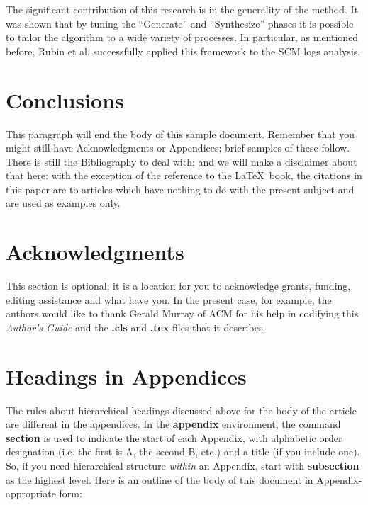 \documentclass{sig-alternate}
\begin{document}
The significant contribution of this research is in the generality of the method. It was shown that by tuning the ``Generate'' and ``Synthesize'' phases it is possible to tailor the algorithm to a wide variety of processes. In particular, as mentioned before, Rubin et al. successfully applied this framework to the SCM logs analysis.

\section{Conclusions}
This paragraph will end the body of this sample document.
Remember that you might still have Acknowledgments or
Appendices; brief samples of these
follow.  There is still the Bibliography to deal with; and
we will make a disclaimer about that here: with the exception
of the reference to the \LaTeX\ book, the citations in
this paper are to articles which have nothing to
do with the present subject and are used as
examples only.

\section{Acknowledgments}
This section is optional; it is a location for you
to acknowledge grants, funding, editing assistance and
what have you.  In the present case, for example, the
authors would like to thank Gerald Murray of ACM for
his help in codifying this \textit{Author's Guide}
and the \textbf{.cls} and \textbf{.tex} files that it describes.

%

%
%
\appendix
\section{Headings in Appendices}
The rules about hierarchical headings discussed above for
the body of the article are different in the appendices.
In the \textbf{appendix} environment, the command
\textbf{section} is used to
indicate the start of each Appendix, with alphabetic order
designation (i.e. the first is A, the second B, etc.) and
a title (if you include one).  So, if you need
hierarchical structure
\textit{within} an Appendix, start with \textbf{subsection} as the
highest level. Here is an outline of the body of this
document in Appendix-appropriate form:
\end{document}
